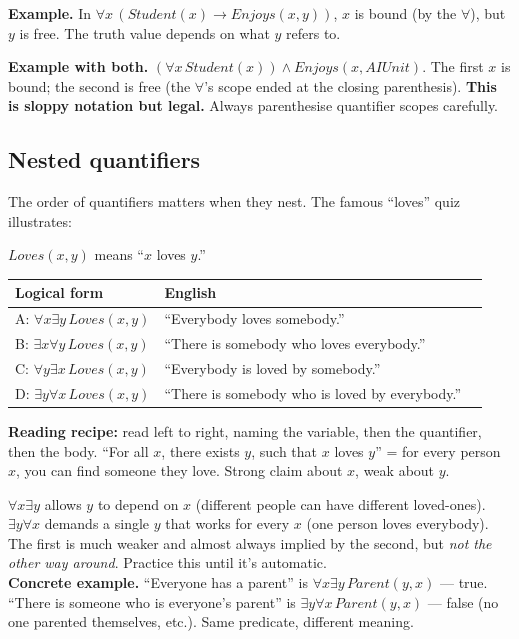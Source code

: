 \documentclass[11pt, a4paper]{article}
\newcommand{\thead}[1]{\textbf{#1}}
\begin{document}
\textbf{Example.} In $\forall x \, (Student(x) \rightarrow Enjoys(x, y))$, $x$ is bound (by the $\forall$), but $y$ is free. The truth value depends on what $y$ refers to.

\textbf{Example with both.} $(\forall x \, Student(x)) \land Enjoys(x, AIUnit)$. The first $x$ is bound; the second is free (the $\forall$'s scope ended at the closing parenthesis). \textbf{This is sloppy notation but legal.} Always parenthesise quantifier scopes carefully.

\subsection{Nested quantifiers}

The order of quantifiers matters when they nest. The famous ``loves'' quiz illustrates:

\begin{exbox}
$Loves(x, y)$ means ``$x$ loves $y$.''\\[0.3em]
\begin{tabular}{@{}lll@{}}
\toprule
\thead{Logical form} & \thead{English} \\
\midrule
A: $\forall x \exists y \, Loves(x, y)$           & ``Everybody loves somebody.'' \\
B: $\exists x \forall y \, Loves(x, y)$           & ``There is somebody who loves everybody.'' \\
C: $\forall y \exists x \, Loves(x, y)$           & ``Everybody is loved by somebody.'' \\
D: $\exists y \forall x \, Loves(x, y)$           & ``There is somebody who is loved by everybody.'' \\
\bottomrule
\end{tabular}
\end{exbox}

\textbf{Reading recipe:} read left to right, naming the variable, then the quantifier, then the body. ``For all $x$, there exists $y$, such that $x$ loves $y$'' = for every person $x$, you can find someone they love. Strong claim about $x$, weak about $y$.

\begin{pitfallbox}
$\forall x \exists y$ allows $y$ to depend on $x$ (different people can have different loved-ones). $\exists y \forall x$ demands a single $y$ that works for every $x$ (one person loves everybody). The first is much weaker and almost always implied by the second, but \emph{not the other way around}. Practice this until it's automatic.\\[0.3em]
\textbf{Concrete example.} ``Everyone has a parent'' is $\forall x \exists y \, Parent(y, x)$ — true. ``There is someone who is everyone's parent'' is $\exists y \forall x \, Parent(y, x)$ — false (no one parented themselves, etc.). Same predicate, different meaning.
\end{pitfallbox}
\end{document}
